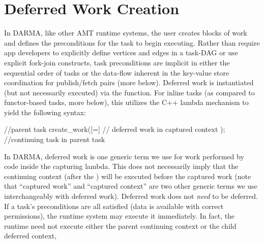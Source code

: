 \section{Deferred Work Creation}
\label{sec:deferred}
In DARMA, like other AMT runtime systems, the user creates blocks of work and defines the preconditions for the task to begin executing.
Rather than require app developers to explicitly define vertices and edges in a task-DAG or use explicit fork-join constructs,
task preconditions are implicit in either the sequential order of tasks or the data-flow inherent in the key-value store coordination for publish/fetch pairs (more below).
Deferred work is instantiated (but not necessarily executed) via the  function. 
For inline tasks (as compared to functor-based tasks, more below), this utilizes the C++ lambda mechanism to yield the following syntax:

\begin{CppCode}
//parent task
create_work([=]{
  // deferred work in captured context
});
//continuing task in parent task
\end{CppCode}

In DARMA, \gls{deferred work} is one generic term we use for work
performed by code inside the capturing \gls{lambda}.
This does not necessarily imply that the \gls{continuing context} (after the ) will be
executed before the \gls{captured work} (note that ``\gls{captured work}'' and
``\gls{captured context}'' are two other generic terms we use interchangeably
with \gls{deferred work}).  
Deferred work does not \emph{need} to be deferred.
If a task's preconditions are all satisfied (data is available with correct permissions),
the \gls{runtime system} may execute it immediately.  
In fact, the runtime need not execute either the parent continuing context or the child deferred context,

